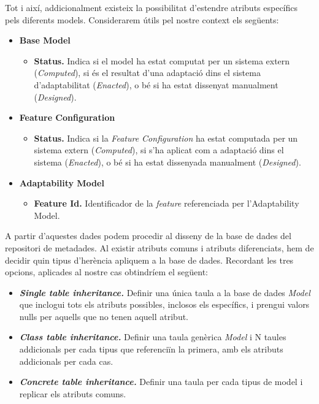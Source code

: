 Tot i així, addicionalment existeix la possibilitat d'estendre atributs específics pels diferents models. Considerarem útils pel nostre context els següents:

\begin{itemize}
\item \textbf{Base Model}
\begin{itemize}
\item \textbf{Status.} Indica si el model ha estat computat per un sistema extern (\textit{Computed}), si és el resultat d'una adaptació dins el sistema d'adaptabilitat (\textit{Enacted}), o bé si ha estat dissenyat manualment (\textit{Designed}).
\end{itemize}
\item \textbf{Feature Configuration}
\begin{itemize}
\item \textbf{Status.} Indica si la \textit{Feature Configuration} ha estat computada per un sistema extern (\textit{Computed}), si s'ha aplicat com a adaptació dins el sistema (\textit{Enacted}), o bé si ha estat dissenyada manualment (\textit{Designed}).
\end{itemize}
\item \textbf{Adaptability Model}
\begin{itemize}
\item \textbf{Feature Id.} Identificador de la \textit{feature} referenciada per l'Adaptability Model.
\end{itemize}
\end{itemize}

A partir d'aquestes dades podem procedir al disseny de la base de dades del repositori de metadades. Al existir atributs comuns i atributs diferenciats, hem de decidir quin tipus d'herència apliquem a la base de dades. Recordant les tres opcions, aplicades al nostre cas obtindríem el següent:

\begin{itemize}
\item \textbf{\textit{Single table inheritance.}} Definir una única taula a la base de dades \textit{Model} que inclogui tots els atributs possibles, inclosos els específics, i prengui valors nulls per aquells que no tenen aquell atribut.
\item \textbf{\textit{Class table inheritance.}} Definir una taula genèrica \textit{Model} i N taules addicionals per cada tipus que referenciïn la primera, amb els atributs addicionals per cada cas.
\item \textbf{\textit{Concrete table inheritance.}} Definir una taula per cada tipus de model i replicar els atributs comuns.
\end{itemize}

